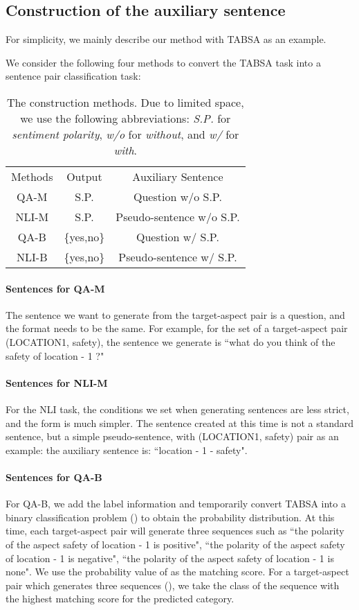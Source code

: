 \documentclass[11pt,a4paper]{article}
\theoremstyle{definition}
\begin{document}
    \subsection{Construction of the auxiliary sentence} \label{construct}
	For simplicity, we mainly describe our method with TABSA as an example.
	
	We consider the following four methods to convert the TABSA task into a sentence pair classification task:
	
	\begin{table}[ht]
		\centering
		\begin{tabular}{c c c}
			\toprule
			Methods & Output & Auxiliary Sentence  \\
			\cline{1-3}
			QA-M & S.P. & Question w/o S.P.\\			
			NLI-M & S.P. & Pseudo-sentence w/o S.P. \\
			QA-B & \{yes,no\} & Question w/ S.P. \\
			NLI-B & \{yes,no\} & Pseudo-sentence w/ S.P.\\
			\bottomrule
		\end{tabular}
		\caption {The construction methods. Due to limited space, we use the following abbreviations: \textit{S.P.} for \textit{sentiment polarity}, \textit{w/o} for \textit{without}, and \textit{w/} for \textit{with}. }
	\end{table}
	
	\paragraph{Sentences for QA-M}
	The sentence we want to generate from the target-aspect pair is a question, and the format needs to be the same. For example, for the set of a target-aspect pair (LOCATION1, safety), the sentence we generate is ``what do you think of the safety of location - 1 ?"
	
	\paragraph{Sentences for NLI-M}
	For the NLI task, the conditions we set when generating sentences are less strict, and the form is much simpler. The sentence created at this time is not a standard sentence, but a simple pseudo-sentence, with (LOCATION1, safety) pair as an example: the auxiliary sentence is: ``location - 1 -  safety".
	
	\paragraph{Sentences for QA-B}
	For QA-B, we add the label information and temporarily convert TABSA into a binary classification problem () to obtain the probability distribution. At this time, each target-aspect pair will generate three sequences such as ``the polarity of the aspect safety of location - 1 is positive", ``the polarity of the aspect safety of location - 1 is negative", ``the polarity of the aspect safety of location - 1 is none". We use the probability value of  as the matching score. For a target-aspect pair which generates three sequences (), we take the class of the sequence with the highest matching score for the predicted category.
	
\end{document}
